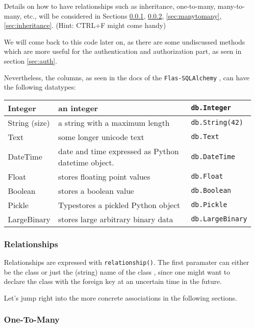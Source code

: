 \documentclass[../main/main.tex]{subfiles}
\begin{document}
Details on how to have relationships such as inheritance, one-to-many,
many-to-many, etc., will be considered in Sections
\ref{sec:relationships}, \ref{sec:onetomany}, \ref{sec:manytomany},
\ref{sec:inheritance}. (Hint: CTRL+F might come handy) 

We will come back to this code later on, as there are some undiscussed
methods which are more useful for the authentication and authorization
part, as seen in section \ref{sec:auth}.

Nevertheless, the columns, as seen in the docs of the
\lstinline|Flas-SQLAlchemy| \cite{mitsuhiko:declare_models}, can have
the following datatypes: 

\begin{tabular}{ | l | l | l | } \\ \hline
Integer & an integer & \lstinline|db.Integer| \\ \hline
String (size) & a string with a maximum length &  \lstinline|db.String(42)|\\ \hline
Text & some longer unicode text &  \lstinline|db.Text|  \\ \hline
DateTime & date and time expressed as Python datetime object. & \lstinline|db.DateTime|\\ \hline
Float & stores floating point values & \lstinline|db.Float| \\ \hline
Boolean & stores a boolean value & \lstinline|db.Boolean| \\ \hline
Pickle & Typestores a pickled Python object &  \lstinline|db.Pickle| \\ \hline
LargeBinary & stores large arbitrary binary data &  \lstinline|db.LargeBinary|\\ \hline
\end{tabular}


\subsubsection{Relationships}
\label{sec:relationships}

Relationships are expressed with \lstinline|relationship()|. The
first paramater can either be the class or just the (string) name of the
class \cite{mitsuhiko:declare_models}, since one might want to declare
the class with the foreign key at an uncertain time in the future. 

Let's jump right into the more concrete associations in the following
sections. 

\subsubsection{One-To-Many}
\label{sec:onetomany}
\end{document}
